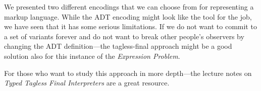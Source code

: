We presented two different encodings that we can choose from for representing a
markup language. While the ADT encoding might look like the tool for the job, we
have seen that it has some serious limitations. If we do not want to commit to a
set of variants forever and do not want to break other people's observers by
changing the ADT definition—the tagless-final approach might be a good solution
also for this instance of the \emph{Expression Problem}.

For those who want to study this approach in more depth—the lecture notes on
\emph{Typed Tagless Final Interpreters} \cite{finally-tagless-tut} are a great
resource.
